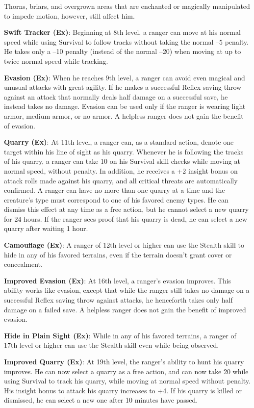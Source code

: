 Thorns, briars, and overgrown areas that are enchanted or magically manipulated to impede motion, however, still affect him.
				
\textbf{Swift Tracker (Ex)}: Beginning at 8th level, a ranger can move at his normal speed while using Survival to follow tracks without taking the normal --5 penalty. He takes only a --10 penalty (instead of the normal --20) when moving at up to twice normal speed while tracking.
				
\textbf{Evasion (Ex)}: When he reaches 9th level, a ranger can avoid even magical and unusual attacks with great agility. If he makes a successful Reflex saving throw against an attack that normally deals half damage on a successful save, he instead takes no damage. Evasion can be used only if the ranger is wearing light armor, medium armor, or no armor. A helpless ranger does not gain the benefit of evasion.
				
\textbf{Quarry (Ex)}: At 11th level, a ranger can, as a standard action, denote one target within his line of sight as his quarry. Whenever he is following the tracks of his quarry, a ranger can take 10 on his Survival skill checks while moving at normal speed, without penalty. In addition, he receives a +2 insight bonus on attack rolls made against his quarry, and all critical threats are automatically confirmed. A ranger can have no more than one quarry at a time and the creature's type must correspond to one of his favored enemy types. He can dismiss this effect at any time as a free action, but he cannot select a new quarry for 24 hours. If the ranger sees proof that his quarry is dead, he can select a new quarry after waiting 1 hour.
				
\textbf{Camouflage (Ex)}: A ranger of 12th level or higher can use the Stealth skill to hide in any of his favored terrains, even if the terrain doesn't grant cover or concealment.
				
\textbf{Improved Evasion (Ex)}: At 16th level, a ranger's evasion improves. This ability works like evasion, except that while the ranger still takes no damage on a successful Reflex saving throw against attacks, he henceforth takes only half damage on a failed save. A helpless ranger does not gain the benefit of improved evasion.
				
\textbf{Hide in Plain Sight (Ex)}: While in any of his favored terrains, a ranger of 17th level or higher can use the Stealth skill even while being observed.
				
\textbf{Improved Quarry (Ex)}: At 19th level, the ranger's ability to hunt his quarry improves. He can now select a quarry as a free action, and can now take 20 while using Survival to track his quarry, while moving at normal speed without penalty. His insight bonus to attack his quarry increases to +4. If his quarry is killed or dismissed, he can select a new one after 10 minutes have passed.
				
